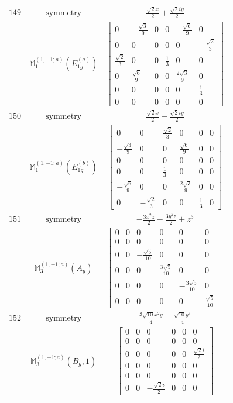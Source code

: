 \documentclass[fleqn,8pt,landscape]{jsarticle}
\begin{document}
\begin{longtable}{ccc}
$ 149 $ & $ \text{symmetry} $ & $ \frac{\sqrt{2} x}{2} + \frac{\sqrt{2} i y}{2} $ \\
$  $ & $ \mathbb{M}_{1}^{(1,-1;a)}(E_{1g}^{(a)}) $ & $ \begin{bmatrix} 0 & - \frac{\sqrt{3}}{9} & 0 & 0 & - \frac{\sqrt{6}}{9} & 0 \\ 0 & 0 & 0 & 0 & 0 & - \frac{\sqrt{2}}{3} \\ \frac{\sqrt{2}}{3} & 0 & 0 & \frac{1}{3} & 0 & 0 \\ 0 & \frac{\sqrt{6}}{9} & 0 & 0 & \frac{2 \sqrt{3}}{9} & 0 \\ 0 & 0 & 0 & 0 & 0 & \frac{1}{3} \\ 0 & 0 & 0 & 0 & 0 & 0 \end{bmatrix} $ \\ \hline
$ 150 $ & $ \text{symmetry} $ & $ \frac{\sqrt{2} x}{2} - \frac{\sqrt{2} i y}{2} $ \\
$  $ & $ \mathbb{M}_{1}^{(1,-1;a)}(E_{1g}^{(b)}) $ & $ \begin{bmatrix} 0 & 0 & \frac{\sqrt{2}}{3} & 0 & 0 & 0 \\ - \frac{\sqrt{3}}{9} & 0 & 0 & \frac{\sqrt{6}}{9} & 0 & 0 \\ 0 & 0 & 0 & 0 & 0 & 0 \\ 0 & 0 & \frac{1}{3} & 0 & 0 & 0 \\ - \frac{\sqrt{6}}{9} & 0 & 0 & \frac{2 \sqrt{3}}{9} & 0 & 0 \\ 0 & - \frac{\sqrt{2}}{3} & 0 & 0 & \frac{1}{3} & 0 \end{bmatrix} $ \\ \hline
$ 151 $ & $ \text{symmetry} $ & $ - \frac{3 x^{2} z}{2} - \frac{3 y^{2} z}{2} + z^{3} $ \\
$  $ & $ \mathbb{M}_{3}^{(1,-1;a)}(A_{g}) $ & $ \begin{bmatrix} 0 & 0 & 0 & 0 & 0 & 0 \\ 0 & 0 & 0 & 0 & 0 & 0 \\ 0 & 0 & - \frac{\sqrt{5}}{10} & 0 & 0 & 0 \\ 0 & 0 & 0 & \frac{3 \sqrt{5}}{10} & 0 & 0 \\ 0 & 0 & 0 & 0 & - \frac{3 \sqrt{5}}{10} & 0 \\ 0 & 0 & 0 & 0 & 0 & \frac{\sqrt{5}}{10} \end{bmatrix} $ \\ \hline
$ 152 $ & $ \text{symmetry} $ & $ \frac{3 \sqrt{10} x^{2} y}{4} - \frac{\sqrt{10} y^{3}}{4} $ \\
$  $ & $ \mathbb{M}_{3}^{(1,-1;a)}(B_{g},1) $ & $ \begin{bmatrix} 0 & 0 & 0 & 0 & 0 & 0 \\ 0 & 0 & 0 & 0 & 0 & 0 \\ 0 & 0 & 0 & 0 & 0 & \frac{\sqrt{2} i}{2} \\ 0 & 0 & 0 & 0 & 0 & 0 \\ 0 & 0 & 0 & 0 & 0 & 0 \\ 0 & 0 & - \frac{\sqrt{2} i}{2} & 0 & 0 & 0 \end{bmatrix} $ \\ \hline

\end{longtable}
\end{document}
